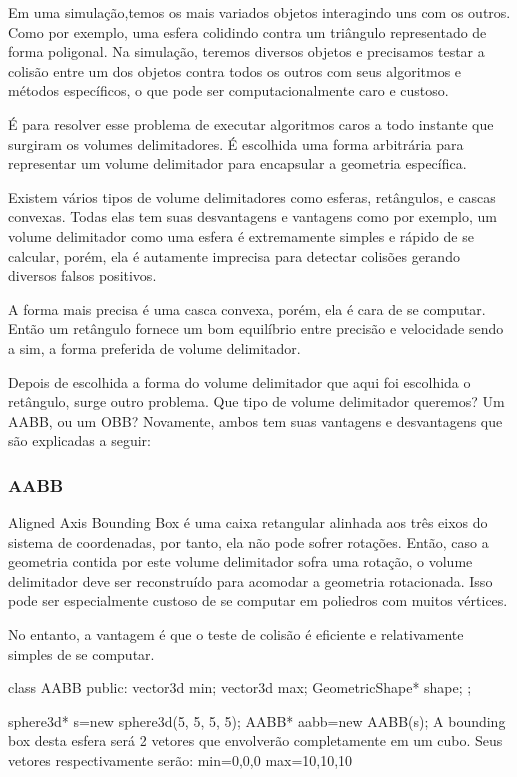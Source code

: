 Em uma simulação,temos os mais variados objetos interagindo uns com os outros.
Como por exemplo, uma esfera colidindo contra um triângulo representado de
forma poligonal. Na simulação, teremos diversos objetos e precisamos testar a
colisão entre um dos objetos contra todos os outros com seus algoritmos e
métodos específicos, o que pode ser computacionalmente caro e custoso.

É para resolver esse problema de executar algoritmos caros a todo instante que
surgiram os volumes delimitadores. É escolhida uma forma arbitrária para
representar um volume delimitador para encapsular a geometria específica.

Existem vários tipos de volume delimitadores como esferas, retângulos, e cascas
convexas. Todas elas tem suas desvantagens e vantagens como por exemplo, um
volume delimitador como uma esfera é extremamente simples e rápido de se
calcular, porém, ela é autamente imprecisa para detectar colisões gerando
diversos falsos positivos.

A forma mais precisa é uma casca convexa, porém, ela é cara de se computar.
Então um retângulo fornece um bom equilíbrio entre precisão e velocidade sendo
a sim, a forma preferida de volume delimitador.

Depois de escolhida a forma do volume delimitador que aqui foi escolhida o
retângulo, surge outro problema. Que tipo de volume delimitador queremos? Um
AABB, ou um OBB? Novamente, ambos tem suas vantagens e desvantagens que são
explicadas a seguir:

\subsubsection{AABB}
Aligned Axis Bounding Box é uma caixa retangular alinhada aos três eixos do
sistema de coordenadas, por tanto, ela não pode sofrer rotações. Então, caso a
geometria contida por este volume delimitador sofra uma rotação, o volume
delimitador deve ser reconstruído para acomodar a geometria rotacionada. Isso
pode ser especialmente custoso de se computar em poliedros com muitos vértices.

No entanto, a vantagem é que o teste de colisão é eficiente e relativamente
simples de se computar.

class AABB
{
public:
vector3d min;
vector3d max;
GeometricShape* shape;
};

sphere3d* s=new sphere3d({5, 5, 5}, 5);
AABB* aabb=new AABB(s);
A bounding box desta esfera será 2 vetores que envolverão completamente em um cubo.
Seus vetores respectivamente serão:
min={0,0,0}
max={10,10,10}


